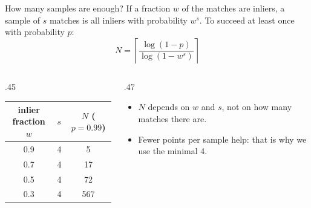 \documentclass[aspectratio=169,11pt]{beamer}
\begin{document}
\begin{frame}{How many samples are enough?}
  If a fraction $w$ of the matches are inliers, a sample of $s$ matches is all inliers with probability $w^s$.
  To succeed at least once with probability $p$:
  \[
    N=\left\lceil\frac{\log(1-p)}{\log\left(1-w^{s}\right)}\right\rceil
  \]
  \vspace{-.3em}
  \begin{columns}[c]
    \begin{column}{.45\textwidth}
      \centering
      \begin{tabular}{@{}ccc@{}}
        \toprule
        inlier fraction $w$ & $s$ & $N$ \;($p=0.99$)\\
        \midrule
        0.9 & 4 & 5\\
        0.7 & 4 & 17\\
        0.5 & 4 & 72\\
        0.3 & 4 & 567\\
        \bottomrule
      \end{tabular}
    \end{column}
    \begin{column}{.47\textwidth}
      \small
      \begin{itemize}\setlength{\itemsep}{.5em}
        \item $N$ depends on $w$ and $s$, not on how many matches there are.
        \item Fewer points per sample help: that is why we use the minimal 4.
      \end{itemize}
    \end{column}
  \end{columns}
\end{frame}
\end{document}

